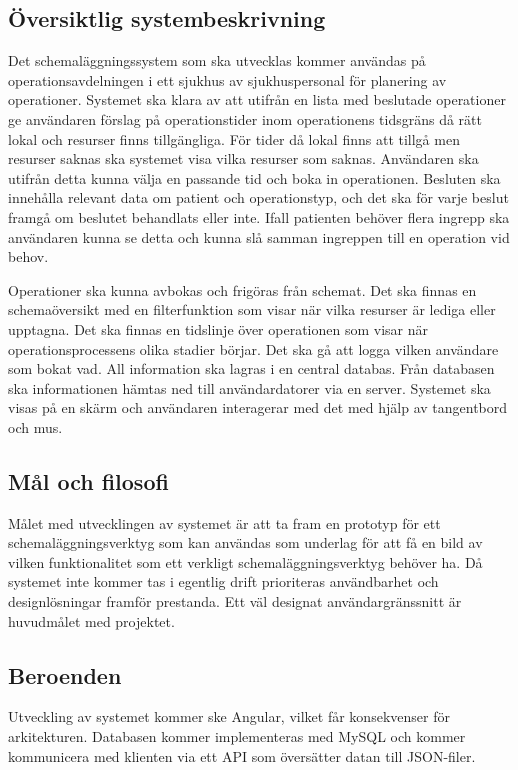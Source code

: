 \documentclass[a4paper,10pt]{article}
\begin{document}
\subsection{Översiktlig systembeskrivning}
Det schemaläggningssystem som ska utvecklas kommer användas på operationsavdelningen i ett sjukhus av sjukhuspersonal för planering av operationer. Systemet ska klara av att utifrån en lista med beslutade operationer ge användaren förslag på operationstider inom operationens tidsgräns då rätt lokal och resurser finns tillgängliga. För tider då lokal finns att tillgå men resurser saknas ska systemet visa vilka resurser som saknas. Användaren ska utifrån detta kunna välja en passande tid och boka in operationen. Besluten ska innehålla relevant data om patient och operationstyp, och det ska för varje beslut framgå om beslutet behandlats eller inte. Ifall patienten behöver flera ingrepp ska användaren kunna se detta och kunna slå samman ingreppen till en operation vid behov.

Operationer ska kunna avbokas och frigöras från schemat. Det ska finnas en schemaöversikt med en filterfunktion som visar när vilka resurser är lediga eller upptagna. Det ska finnas en tidslinje över operationen som visar när operationsprocessens olika stadier börjar. Det ska gå att logga vilken användare som bokat vad. All information ska lagras i en central databas. Från databasen ska informationen hämtas ned till användardatorer via en server. Systemet ska visas på en skärm och användaren interagerar med det med hjälp av tangentbord och mus.


\subsection{Mål och filosofi}
Målet med utvecklingen av systemet är att ta fram en prototyp för ett schemaläggningsverktyg som kan användas som underlag för att få en bild av vilken funktionalitet som ett verkligt schemaläggningsverktyg behöver ha. Då systemet inte kommer tas i egentlig drift prioriteras användbarhet och designlösningar framför prestanda. Ett väl designat användargränssnitt är huvudmålet med projektet.

\subsection{Beroenden}
Utveckling av systemet kommer ske Angular, vilket får konsekvenser för arkitekturen. Databasen kommer implementeras med MySQL och kommer kommunicera med klienten via ett API som översätter datan till JSON-filer.
\end{document}
